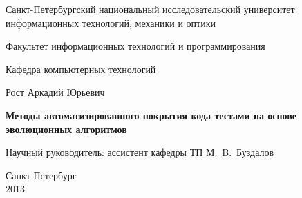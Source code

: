 \documentclass[a4paper]{report}
\theoremstyle{plain}
\theoremstyle{definition}
\numberwithin{theorem}{chapter}        %
\begin{document}
 \renewcommand{\thelstlisting}{\thesection.\arabic{lstlisting}}
\initializefrontsections

\pagestyle{title}

\begin{center}
Санкт-Петербургский национальный исследовательский университет \\ информационных технологий, механики и оптики

\vspace{2cm}

Факультет информационных технологий и программирования

Кафедра компьютерных технологий

\vspace{3cm}

{\Large Рост Аркадий Юрьевич}

\vspace{2cm}

\vbox{\LARGE\bfseries
Методы автоматизированного покрытия кода тестами на основе эволюционных алгоритмов
}

\vspace{4cm}

{\Large Научный руководитель: ассистент кафедры ТП М.~B.~Буздалов}

\vspace{6cm}

Санкт-Петербург\\ 2013
\end{center}

\newpage

\setcounter{page}{3}
\pagestyle{plain}

\tableofcontents

\startthechapters







\printbibliography

%
\end{document}
